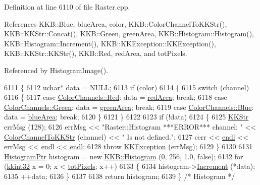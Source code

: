 Definition at line 6110 of file Raster.\+cpp.



References K\+K\+B\+::\+Blue, blue\+Area, color, K\+K\+B\+::\+Color\+Channel\+To\+K\+K\+Str(), K\+K\+B\+::\+K\+K\+Str\+::\+Concat(), K\+K\+B\+::\+Green, green\+Area, K\+K\+B\+::\+Histogram\+::\+Histogram(), K\+K\+B\+::\+Histogram\+::\+Increment(), K\+K\+B\+::\+K\+K\+Exception\+::\+K\+K\+Exception(), K\+K\+B\+::\+K\+K\+Str\+::\+K\+K\+Str(), K\+K\+B\+::\+Red, red\+Area, and tot\+Pixels.



Referenced by Histogram\+Image().


\begin{DoxyCode}
6111 \{
6112   \hyperlink{namespace_k_k_b_ace9969169bf514f9ee6185186949cdf7}{uchar}*  data = NULL;
6113   \textcolor{keywordflow}{if}  (\hyperlink{class_k_k_b_1_1_raster_a482384d89cc53fa4f36276307c746854}{color})
6114   \{
6115     \textcolor{keywordflow}{switch}  (channel)
6116     \{
6117     \textcolor{keywordflow}{case}  \hyperlink{namespace_k_k_b_a91743d17eafa05c7ff4e08017ac2b718aee38e4d5dd68c4e440825018d549cb47}{ColorChannels::Red}:   data = \hyperlink{class_k_k_b_1_1_raster_aaef16f7d4dc7c8b99e84176d0babd731}{redArea};    \textcolor{keywordflow}{break};
6118     \textcolor{keywordflow}{case}  \hyperlink{namespace_k_k_b_a91743d17eafa05c7ff4e08017ac2b718ad382816a3cbeed082c9e216e7392eed1}{ColorChannels::Green}: data = \hyperlink{class_k_k_b_1_1_raster_ad981258f1f7284a8bd0cd0466f328cdf}{greenArea};  \textcolor{keywordflow}{break};
6119     \textcolor{keywordflow}{case}  \hyperlink{namespace_k_k_b_a91743d17eafa05c7ff4e08017ac2b718a9594eec95be70e7b1710f730fdda33d9}{ColorChannels::Blue}:  data = \hyperlink{class_k_k_b_1_1_raster_af7996dfe61613e5ecf91454175bfe3f1}{blueArea};   \textcolor{keywordflow}{break};
6120     \}
6121   \}
6122 
6123   \textcolor{keywordflow}{if}  (!data)
6124   \{
6125     \hyperlink{class_k_k_b_1_1_k_k_str}{KKStr}  errMsg (128);
6126     errMsg << \textcolor{stringliteral}{"Raster::Histogram   ***ERROR***    channel: "} << 
      \hyperlink{namespace_k_k_b_a97094dfff18985dad35d066bbabc3c69}{ColorChannelToKKStr} (channel) << \textcolor{stringliteral}{"  Is not defined."};
6127     cerr << \hyperlink{namespace_k_k_b_ad1f50f65af6adc8fa9e6f62d007818a8}{endl} << errMsg << \hyperlink{namespace_k_k_b_ad1f50f65af6adc8fa9e6f62d007818a8}{endl} << \hyperlink{namespace_k_k_b_ad1f50f65af6adc8fa9e6f62d007818a8}{endl};
6128     \textcolor{keywordflow}{throw} \hyperlink{class_k_k_b_1_1_k_k_exception}{KKException} (errMsg);
6129   \}
6130 
6131   \hyperlink{class_k_k_b_1_1_histogram}{HistogramPtr} histogram = \textcolor{keyword}{new} \hyperlink{class_k_k_b_1_1_histogram}{KKB::Histogram} (0, 256, 1.0, \textcolor{keyword}{false});
6132   \textcolor{keywordflow}{for}  (\hyperlink{namespace_k_k_b_a8fa4952cc84fda1de4bec1fbdd8d5b1b}{kkint32} x = 0;  x < \hyperlink{class_k_k_b_1_1_raster_a9b08c4a0ca0a35435a478599635f1dc0}{totPixels};  x++)
6133   \{
6134     histogram->\hyperlink{class_k_k_b_1_1_histogram_a1be7a2f10e83373a0e0083b970e0adfa}{Increment} (*data);
6135     ++data;
6136   \}
6137 
6138   \textcolor{keywordflow}{return}  histogram;
6139 \}  \textcolor{comment}{/* Histogram */}
\end{DoxyCode}
